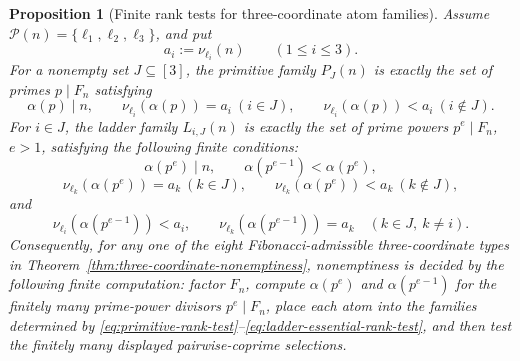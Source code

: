 \documentclass[11pt,letterpaper]{article}
\numberwithin{equation}{section}
\theoremstyle{plain}
\newtheorem{proposition}[theorem]{Proposition}
\theoremstyle{definition}
\theoremstyle{remark}
\begin{document}
\begin{proposition}[Finite rank tests for three-coordinate atom families]
\label{prop:three-coordinate-finite-recipe}
Assume \(\mathcal P(n)=\{\ell_1,\ell_2,\ell_3\}\), and put
\[
a_i:=\nu_{\ell_i}(n)\qquad(1\le i\le3).
\]
For a nonempty set \(J\subseteq[3]\), the primitive family \(P_J(n)\) is
exactly the set of primes \(p\mid F_n\) satisfying
\begin{equation}\label{eq:primitive-rank-test}
\alpha(p)\mid n,\qquad
\nu_{\ell_i}(\alpha(p))=a_i\ (i\in J),\qquad
\nu_{\ell_i}(\alpha(p))<a_i\ (i\notin J).
\end{equation}
For \(i\in J\), the ladder family \(L_{i,J}(n)\) is exactly the set of prime
powers \(p^e\mid F_n\), \(e>1\), satisfying the following finite conditions:
\begin{equation}\label{eq:ladder-atomic-rank-test}
\alpha(p^e)\mid n,\qquad \alpha(p^{e-1})<\alpha(p^e),
\end{equation}
\begin{equation}\label{eq:ladder-full-rank-test}
\nu_{\ell_k}(\alpha(p^e))=a_k\ (k\in J),\qquad
\nu_{\ell_k}(\alpha(p^e))<a_k\ (k\notin J),
\end{equation}
and
\begin{equation}\label{eq:ladder-essential-rank-test}
\nu_{\ell_i}(\alpha(p^{e-1}))<a_i,\qquad
\nu_{\ell_k}(\alpha(p^{e-1}))=a_k\quad(k\in J,\ k\ne i).
\end{equation}
Consequently, for any one of the eight Fibonacci-admissible
three-coordinate types in Theorem~\ref{thm:three-coordinate-nonemptiness},
nonemptiness is decided by the following finite computation: factor \(F_n\),
compute \(\alpha(p^e)\) and \(\alpha(p^{e-1})\) for the finitely many
prime-power divisors \(p^e\mid F_n\), place each atom into the families determined
by \eqref{eq:primitive-rank-test}--\eqref{eq:ladder-essential-rank-test}, and
then test the finitely many displayed pairwise-coprime selections.
\end{proposition}
\end{document}

